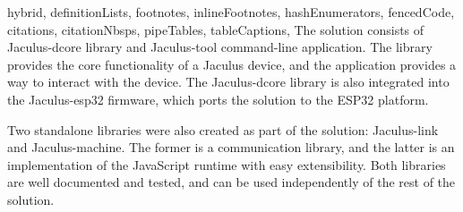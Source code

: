 \begin{markdown*}{%
  hybrid,
  definitionLists,
  footnotes,
  inlineFootnotes,
  hashEnumerators,
  fencedCode,
  citations,
  citationNbsps,
  pipeTables,
  tableCaptions,
}
The solution consists of Jaculus-dcore library and Jaculus-tool command-line application. The library provides the core functionality of a Jaculus device, and the application provides a way to interact with the device. The Jaculus-dcore library is also integrated into the Jaculus-esp32 firmware, which ports the solution to the ESP32 platform.

Two standalone libraries were also created as part of the solution: Jaculus-link and Jaculus-machine. The former is a communication library, and the latter is an implementation of the JavaScript runtime with easy extensibility. Both libraries are well documented and tested, and can be used independently of the rest of the solution.


\end{markdown*}

